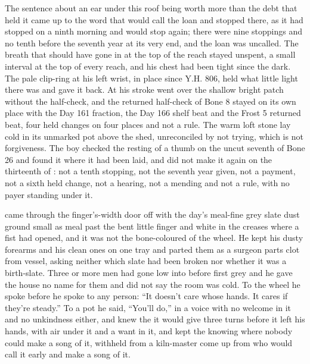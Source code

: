 The sentence about an ear under this roof being worth more than the debt that held it came up to the word that would call the loan and stopped there, as it had stopped on a ninth morning and would stop again; there were nine stoppings and no tenth before the seventh year at its very end, and the loan was uncalled. The breath that should have gone in at the top of the reach stayed unspent, a small interval at the top of every reach, and his chest had been tight since the dark. The pale clip-ring at his left wrist, in place since Y.H. 806, held what little light there was and gave it back. At  his stroke went over the shallow bright patch without the half-check, and the returned half-check of Bone 8 stayed on its own place with the Day 161 fraction, the Day 166 shelf beat and the Frost 5 returned beat, four held changes on four places and not a rule. The warm loft stone lay cold in its unmarked pot above the shed, unreconciled by not trying, which is not forgiveness. The boy checked the resting of a thumb on the uncut seventh of Bone 26 and found it where it had been laid, and did not make it again on the thirteenth of : not a tenth stopping, not the seventh year given, not a payment, not a sixth held change, not a hearing, not a mending and not a rule, with no payer standing under it.

 came through the finger's-width door off  with the day's meal-fine grey slate dust ground small as meal past the bent little finger and white in the creases where a fist had opened, and it was not the bone-coloured  of the wheel. He kept his dusty forearms and his clean ones on one tray and parted them as a surgeon parts clot from vessel, asking neither which slate had been broken nor whether it was a birth-slate. Three or more men had gone low into  before first grey and he gave the house no name for them and did not say the room was cold. To the wheel he spoke before he spoke to any person: “It doesn't care whose hands. It cares if they're steady.” To a pot he said, “You'll do,” in a voice with no welcome in it and no unkindness either, and knew the  it would give three turns before it left his hands, with air under it and a want in it, and kept the knowing where nobody could make a song of it, withheld from a kiln-master come up from  who would call it early and make a song of it.

